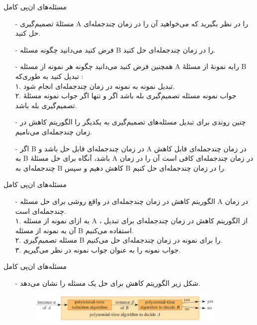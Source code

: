 \begin{frame}{مسئله‌های ان‌پی کامل}
\begin{itemize}\itemr
\item[-]
مسئلهٔ تصمیم‌گیری A را در نظر بگیرید که می‌خواهید آن را در زمان چندجمله‌ای حل کنید.
\item[-]
فرض کنید می‌دانید چگونه مسئله B را در زمان چند‌جمله‌ای حل کنید.
\item[-]
همچنین فرض کنید می‌دانید چگونه هر نمونه
\m{\alpha}
از مسئله A رابه نمونهٔ
\m{\beta}
از مسئلهٔ B تبدیل کنید به طوری‌که :\\
۱. تبدیل نمونه
\m{\alpha}
به نمونه
\m{\beta}
در زمان چند‌جمله‌ای انجام شود.\\
۲. جواب نمونه مسئله تصمیم‌گیری
\m{\alpha}
بله باشد اگر و تنها اگر جواب نمونه مسئلهٔ تصمیم‌گیری
\m{\beta}
بله باشد.
\item[-]
چنین روندی برای تبدیل مسئله‌های تصمیم‌گیری به یکدیگر را الگوریتم کاهش در زمان چندجمله‌ای
می‌نامیم.
\item[-]
اگر B در زمان چندجمله‌ای قابل حل باشد و A در زمان چندجمله‌ای قابل کاهش به B باشد، آنگاه برای حل مسئلهٔ A در زمان چندجمله‌ای کافی است آن را در زمان چندجمله‌ای به B کاهش دهیم و سپس B را در زمان چندجمله‌ای حل کنیم.
\end{itemize}
\end{frame}


\begin{frame}{مسئله‌های ان‌پی کامل}
\begin{itemize}\itemr
\item[-]
الگوریتم کاهش در زمان چندجمله‌ای در واقع روشی برای حل مسئله A در زمان چند‌جمله‌ای است.\\
۱. به ازای نمونه
\m{\alpha}
از مسئله A ، از الگوریتم کاهش در زمان چندجمله‌ای برای تبدیل آن به نمونه
\m{\beta}
از مسئله B استفاده می‌کنیم.\\
۲. مسئله تصمیم‌گیری B را برای نمونه
\m{\beta}
در زمان چندجمله‌ای حل می‌کنیم.\\
۳. جواب نمونه
\m{\beta}
را به عنوان جواب نمونه
\m{\alpha}
در نظر می‌گیریم.
\end{itemize}
\end{frame}


\begin{frame}{مسئله‌های ان‌پی کامل}
\begin{itemize}\itemr
\item[-]
شکل زیر الگوریتم کاهش برای حل یک مسئله را نشان می‌دهد.
\begin{figure}
\includegraphics[width=0.9\textwidth]{figs/chap08/1046-reduction}
\end{figure}
\end{itemize}
\end{frame}


